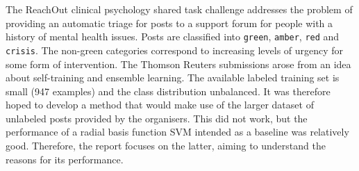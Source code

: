 The ReachOut clinical psychology shared task challenge addresses the problem of providing an automatic triage for posts to a support forum for people with a history of mental health issues. Posts are classified into \verb+green+, \verb+amber+, \verb+red+ and \verb+crisis+. The non-green categories correspond to increasing levels of urgency for some form of intervention. The Thomson Reuters submissions arose from an idea about self-training and ensemble learning. The available labeled training set is small (947 examples) and the class distribution unbalanced. It was therefore hoped to develop a method that would make use of the larger dataset of unlabeled posts provided by the organisers. This did not work, but  the performance of a radial basis function SVM intended as a baseline was relatively good. Therefore, the report focuses on the latter, aiming to understand the reasons for its performance.
